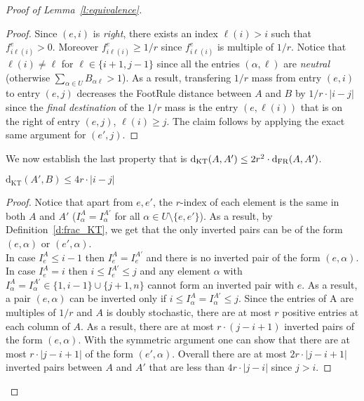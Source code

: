 \begin{proof}[Proof of Lemma~\ref{l:equivalence}]
\begin{proof}
\noindent Since $(e,i)$ is \textit{right}, there exists an index $\ell(i) >i$ such that $f_{i \ell(i)}^e > 0$. Moreover $f_{i \ell(i)}^e \geq 1/r$ since $f_{i \ell(i)}^e$ is multiple of $1/r$. Notice that $\ell(i) \neq \ell$ for $\ell \in \{i+1,j-1\}$ since all the entries $(\alpha,\ell)$ are \textit{neutral} (otherwise $\sum_{\alpha \in U} B_{\alpha \ell } > 1$). As a result, transfering $1/r$ mass from entry $(e,i)$ to entry $(e,j)$ decreases the FootRule distance between $A$ and $B$ by $1/r\cdot|i-j|$ since the \textit{final destination} of the $1/r$ mass is the entry $(e,\ell(i))$ that is on the right of entry $(e,j)$, $\ell(i) \geq j$. The claim follows by applying the exact same argument for $(e',j)$.    
\end{proof}

\noindent We now establish the last property that is $\mathrm{d}_{\mathrm{KT}}(A,A') \leq 2r^2 \cdot \mathrm{d}_{\mathrm{FR}}(A,A')$.
    
    \begin{claim}
        $\mathrm{d}_{\mathrm{KT}}( A', B ) \leq 4r \cdot | i - j|$
    \end{claim}
    
    \begin{proof}
        \noindent Notice that apart from $e,e'$, the $r$-index of each element is the same in both $A$ and $A'$ ($I_\alpha^{A} = I_\alpha^{A'}$ for all $\alpha \in U \setminus \{e, e'\}$). As a result, by Definition~\ref{d:frac_KT}, we get that the only inverted pairs can be of the form $(e,\alpha)$ or $(e',\alpha)$.\\
    
        \noindent In case $I_e^A \leq i-1$ then $I_e^A = I_e^{A'}$ and there is no inverted pair of the form $(e,\alpha)$. In case $I_e^A = i$ then $i \leq I_e^{A'} \leq j$ and any element $\alpha$ with $I_\alpha^A =
        I_\alpha^{A'} \in \{1,i-1\}\cup \{j+1,n\}$ cannot form an inverted pair with $e$. As a result, a pair $(e,\alpha)$ can be inverted only if $i \leq I_\alpha^A = I_\alpha^{A'} \leq j$. Since the entries of A are multiples of $1/r$ and $A$ is doubly stochastic, there are at most
        $r$ positive entries at each column of $A$. As a result, there are at most $r \cdot (j-i+1)$ inverted pairs of the form $(e,\alpha)$. With the symmetric argument one can show that there are at most $r\cdot |j-i+1|$ of the form $(e',\alpha)$. Overall there are at most $2r\cdot |j-i+1|$ inverted pairs between $A$ and $A'$ that are less than $4r\cdot |j-i|$ since $j > i$.
    \end{proof}
    \end{proof}
    

